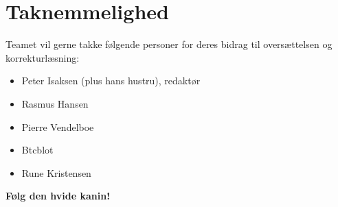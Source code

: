 \section*{Taknemmelighed}

Teamet vil gerne takke følgende personer for deres bidrag til
oversættelsen og korrekturlæsning:

\begin{itemize}
\item Peter Isaksen (plus hans hustru), redaktør
\item Rasmus Hansen
\item Pierre Vendelboe
\item Btcblot
\item Rune Kristensen
\end{itemize}

\textbf{Følg den hvide kanin!}

